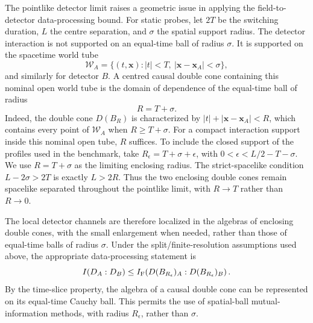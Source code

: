 \documentclass[pdflatex,sn-mathphys-num]{sn-jnl}
\begin{document}
The pointlike detector limit raises a geometric issue in applying the field-to-detector data-processing bound. For static probes, let $2T$ be the switching duration, $L$ the centre separation, and $\sigma$ the spatial support radius. The detector interaction is not supported on an equal-time ball of radius $\sigma$. It is supported on the spacetime world tube
\begin{equation}
\mathcal W_A=\{(t,\mathbf x): |t|<T,\ 
|\mathbf x-\mathbf x_A|<\sigma\},
\label{eq:detector-worldtube}
\end{equation}
and similarly for detector $B$. A centred causal double cone containing this nominal open world tube is the domain of dependence of the equal-time ball of radius
\begin{equation}
R=T+\sigma.
\label{eq:enclosing-doublecone-radius}
\end{equation}
Indeed, the double cone $D(B_R)$ is characterized by $|t|+|\mathbf x-\mathbf x_A|<R$, which contains every point of $\mathcal W_A$ when $R\geq T+\sigma$. For a compact interaction support inside this nominal open tube, $R$ suffices. To include the closed support of the profiles used in the benchmark, take $R_\epsilon=T+\sigma+\epsilon$, with $0<\epsilon<L/2-T-\sigma$. We use $R=T+\sigma$ as the limiting enclosing radius. The strict-spacelike condition $L-2\sigma>2T$ is exactly $L>2R$. Thus the two enclosing double cones remain spacelike separated throughout the pointlike limit, with $R\to T$ rather than $R\to0$.

The local detector channels are therefore localized in the algebras of enclosing double cones, with the small enlargement when needed, rather than those of equal-time balls of radius $\sigma$. Under the split/finite-resolution assumptions used above, the appropriate data-processing statement is
\begin{equation}
I(D_A:D_B)\leq
I_{\rm F}\!\left(D(B_{R_\epsilon})_A:
D(B_{R_\epsilon})_B\right).
\label{eq:correct-doublecone-dpi}
\end{equation}
By the time-slice property, the algebra of a causal double cone can be represented on its equal-time Cauchy ball. This permits the use of spatial-ball mutual-information methods, with radius $R_\epsilon$, rather than $\sigma$.
\end{document}
